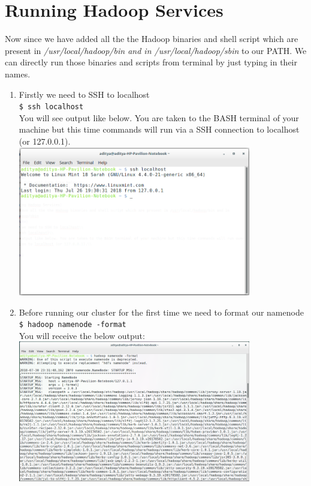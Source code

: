 \documentclass[12pt]{article}%
\begin{document}
\section{Running Hadoop Services}
Now since we have added all the the Hadoop binaries and shell script which are present in \emph{/usr/local/hadoop/bin and in /usr/local/hadoop/sbin} to our PATH. We can directly run those binaries and scripts from terminal by just typing in their names.
\begin{enumerate}
\item Firstly we need to SSH to localhost\\
\lstinline{$ ssh localhost}\\
You will see output like below. You are taken to the BASH terminal of your machine but this time commands will run via a SSH connection to localhost (or 127.0.0.1).\\
\includegraphics[width=0.8\textwidth]{shssh.png}

\item Before running our cluster for the first time we need to format our namenode\\
\lstinline{$ hadoop namenode -format}\\
You will receive the below output:\\
\includegraphics[width=0.8\textwidth]{namenodeformat.png}


\end{enumerate}
\end{document}
